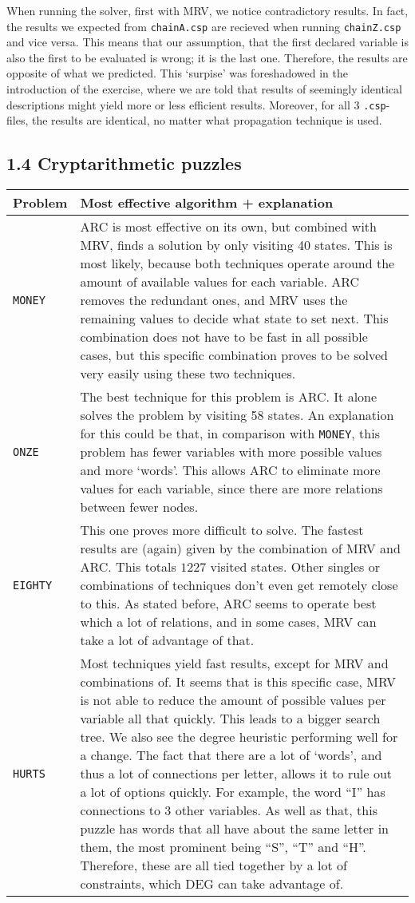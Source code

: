 \documentclass{article}
\begin{document}
When running the solver, first with MRV, we notice contradictory results. In fact, the results we expected from \verb|chainA.csp| are recieved when running \verb|chainZ.csp| and vice versa. This means that our assumption, that the first declared variable is also the first to be evaluated is wrong; it is the last one. Therefore, the results are opposite of what we predicted. This `surpise' was foreshadowed in the introduction of the exercise, where we are told that results of seemingly identical descriptions might yield more or less efficient results. Moreover, for all 3 \verb|.csp|-files, the results are identical, no matter what propagation technique is used.

\subsection*{1.4 \hspace*{0.3cm} Cryptarithmetic puzzles}
\begin{tabular}{L{1.7cm}|L{13cm}}
Problem & Most effective algorithm + explanation\\\hline
\verb|MONEY| & ARC is most effective on its own, but combined with MRV, finds a solution by only visiting 40 states. This is most likely, because both techniques operate around the amount of available values for each variable. ARC removes the redundant ones, and MRV uses the remaining values to decide what state to set next. This combination does not have to be fast in all possible cases, but this specific combination proves to be solved very easily using these two techniques. \\\hline
\verb|ONZE| & The best technique for this problem is ARC. It alone solves the problem by visiting 58 states. An explanation for this could be that, in comparison with \verb|MONEY|, this problem has fewer variables with more possible values and more `words'. This allows ARC to eliminate more values for each variable, since there are more relations between fewer nodes. \\\hline
\verb|EIGHTY| & This one proves more difficult to solve. The fastest results are (again) given by the combination of MRV and ARC. This totals $1227$ visited states. Other singles or combinations of techniques don't even get remotely close to this. As stated before, ARC seems to operate best which a lot of relations, and in some cases, MRV can take a lot of advantage of that. \\\hline
\verb|HURTS| & Most techniques yield fast results, except for MRV and combinations of. It seems that is this specific case, MRV is not able to reduce the amount of possible values per variable all that quickly. This leads to a bigger search tree. We also see the degree heuristic performing well for a change. The fact that there are a lot of `words', and thus a lot of connections per letter, allows it to rule out a lot of options quickly. For example, the word ``I'' has connections to 3 other variables. As well as that, this puzzle has words that all have about the same letter in them, the most prominent being ``S'', ``T'' and ``H''. Therefore, these are all tied together by a lot of constraints, which DEG can take advantage of.\\
\end{tabular}
\end{document}
